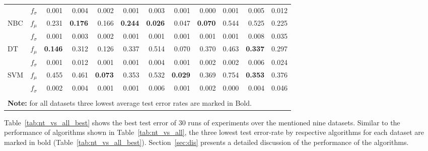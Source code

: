\documentclass[conference]{IEEEtran}
\begin{document}
\begin{table*}
\begin{center}
\begin{tabular}{lrrrrrrrrrrr}
            & $ f_{\sigma} $ & 0.001 & 0.004 & 0.002 & 0.001 & 0.003 & 0.001 & 0.000 & 0.001 & 0.005 & 0.012 \\
            NBC & $ f_{\mu} $ & 0.231 & \textbf{0.176} & 0.166 & \textbf{0.244} & \textbf{0.026} & 0.047 & \textbf{0.070} & 0.544 & 0.525 & 0.225 \\
            & $ f_{\sigma} $ & 0.001 & 0.003 & 0.002 & 0.001 & 0.001 & 0.001 & 0.001 & 0.001 & 0.008 & 0.035 \\
            DT & $ f_{\mu} $ & \textbf{0.146} & 0.312 & 0.126 & 0.337 & 0.514 & 0.070 & 0.370 & 0.463 & \textbf{0.337} & 0.297 \\  
            & $ f_{\sigma} $ & 0.001 & 0.012 & 0.001 & 0.001 & 0.004 & 0.001 & 0.002 & 0.002 & 0.006 & 0.024 \\
            SVM & $ f_{\mu} $ & 0.455 & 0.461 & \textbf{0.073} & 0.353 & 0.532 & \textbf{0.029} & 0.369 & 0.754 & \textbf{0.353} & 0.376 \\
            & $ f_{\sigma} $ & 0.002 & 0.004 & 0.001 & 0.001 & 0.006 & 0.001 & 0.002 & 0.000 & 0.004 & 0.046 \\
            \hline
            \\[-6pt]
            \multicolumn{12}{p{16cm}}{\textbf{Note:} for all datasets three lowest average test error rates are marked in Bold.} \end{tabular}
    \end{center}
\end{table*}

Table~\ref{tab:nt_vs_all_best} shows the best test error of 30 runs of experiments over the mentioned nine datasets. Similar to the performance of algorithms shown in Table~\ref{tab:nt_vs_all}, the three lowest test error-rate by respective algorithms for each dataset are marked in bold (Table~\ref{tab:nt_vs_all_best}). Section~\ref{sec:dis} presents a detailed discussion of the performance of the algorithms.
\end{document}
